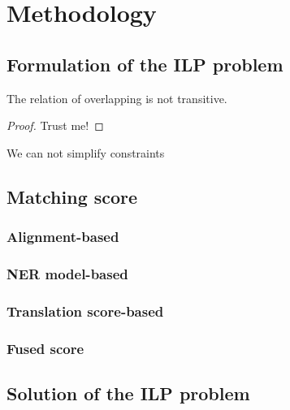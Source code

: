 \chapter{Methodology}
\label{sec:methodology}

\section{Formulation of the ILP problem}

\begin{definition}

\end{definition}
\begin{definition}

\end{definition}


\begin{theorem}
    The relation of overlapping is not transitive.
\end{theorem}
\begin{proof}
    Trust me!
\end{proof}

\begin{corollary}
    We can not simplify constraints
\end{corollary}

\section{Matching score}
\subsection{Alignment-based}

\subsection{NER model-based}

\subsection{Translation score-based}

\subsection{Fused score}

\section{Solution of the ILP problem}